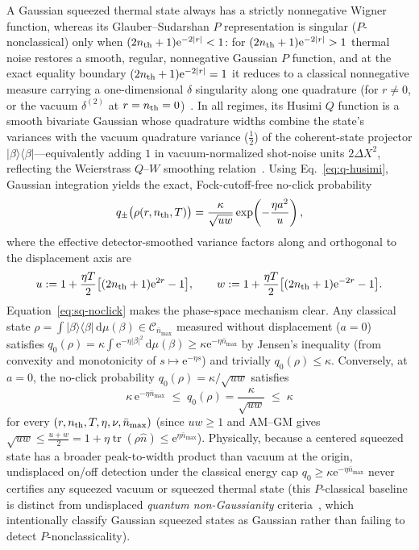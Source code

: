 \documentclass{iopjournal}
\newcommand{\tr}{\operatorname{tr}}
\newcommand{\Cset}{\mathcal{C}}
\newcommand{\nbar}{\bar n_{\max}}
\newcommand{\ket}[1]{\lvert #1\rangle}
\newcommand{\bra}[1]{\langle #1\rvert}
\newcommand{\abs}[1]{\lvert #1\rvert}
\newcommand{\dd}{\mathrm{d}}
\newcommand{\ee}{\mathrm{e}}
\begin{document}
A Gaussian squeezed thermal state always has a strictly nonnegative Wigner function, whereas its Glauber--Sudarshan $P$ representation is singular ($P$-nonclassical) only when $(2n_{\rm th}+1)\ee^{-2\abs{r}} < 1$: for $(2n_{\rm th}+1)\ee^{-2\abs{r}} > 1$ thermal noise restores a smooth, regular, nonnegative Gaussian $P$ function, and at the exact equality boundary $(2n_{\rm th}+1)\ee^{-2\abs{r}} = 1$ it reduces to a classical nonnegative measure carrying a one-dimensional $\delta$ singularity along one quadrature (for $r \neq 0$, or the vacuum $\delta^{(2)}$ at $r = n_{\rm th} = 0$)~\cite{GerryKnight2005}. In all regimes, its Husimi $Q$ function is a smooth bivariate Gaussian whose quadrature widths combine the state's variances with the vacuum quadrature variance ($\frac{1}{2}$) of the coherent-state projector $\ket{\beta}\!\bra{\beta}$---equivalently adding $1$ in vacuum-normalized shot-noise units $2\Delta X^2$, reflecting the Weierstrass $Q$--$W$ smoothing relation~\cite{ScullyZubairy1997,GerryKnight2005}. Using Eq.~\eqref{eq:q-husimi}, Gaussian integration yields the exact, Fock-cutoff-free no-click probability
\begin{equation}\label{eq:sq-noclick}
q_\pm\bigl(\rho(r,n_{\rm th},T)\bigr) = \frac{\kappa}{\sqrt{u w}}\exp\!\left(-\frac{\eta a^2}{u}\right),
\end{equation}
where the effective detector-smoothed variance factors along and orthogonal to the displacement axis are
\begin{equation}\label{eq:sq-uw}
u := 1 + \frac{\eta T}{2}\bigl[(2n_{\rm th}+1)\ee^{2r} - 1\bigr], \qquad
w := 1 + \frac{\eta T}{2}\bigl[(2n_{\rm th}+1)\ee^{-2r} - 1\bigr].
\end{equation}
Equation~\eqref{eq:sq-noclick} makes the phase-space mechanism clear. Any classical state $\rho = \int \ket{\beta}\!\bra{\beta}\,\dd\mu(\beta) \in \Cset_{\nbar}$ measured without displacement ($a = 0$) satisfies $q_0(\rho) = \kappa \int \ee^{-\eta\abs{\beta}^2}\,\dd\mu(\beta) \ge \kappa\ee^{-\eta\nbar}$ by Jensen's inequality (from convexity and monotonicity of $s \mapsto \ee^{-\eta s}$) and trivially $q_0(\rho) \le \kappa$. Conversely, at $a = 0$, the no-click probability $q_0(\rho) = \kappa/\sqrt{uw}$ satisfies
\begin{equation}\label{eq:undisplaced-bound}
\kappa\,\ee^{-\eta\nbar} \;\le\; q_0(\rho) = \frac{\kappa}{\sqrt{uw}} \;\le\; \kappa
\end{equation}
for every $(r, n_{\rm th}, T, \eta, \nu, \nbar)$ (since $uw \ge 1$ and AM--GM gives $\sqrt{uw} \le \frac{u+w}{2} = 1 + \eta\tr(\rho\hat n) \le \ee^{\eta\nbar}$). Physically, because a centered squeezed state has a broader peak-to-width product than vacuum at the origin, undisplaced on/off detection under the classical energy cap $q_0 \ge \kappa\ee^{-\eta\nbar}$ never certifies any squeezed vacuum or squeezed thermal state (this $P$-classical baseline is distinct from undisplaced \emph{quantum non-Gaussianity} criteria~\cite{FiurasekLachmanFilip2021}, which intentionally classify Gaussian squeezed states as Gaussian rather than failing to detect $P$-nonclassicality).
\end{document}
